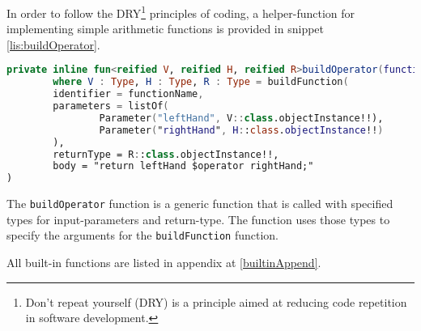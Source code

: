 In order to follow the DRY\footnote{Don't repeat yourself (DRY) is a principle aimed at reducing code repetition in software development.
} principles of coding, a helper-function for implementing simple arithmetic functions is provided in snippet \ref{lis:buildOperator}.
\begin{lstlisting}[language=Kotlin,label=lis:buildOperator,caption=The implementation of buildOperator.]
private inline fun<reified V, reified H, reified R>buildOperator(functionName: String, operator: String = functionName)
        where V : Type, H : Type, R : Type = buildFunction(
        identifier = functionName,
        parameters = listOf(
                Parameter("leftHand", V::class.objectInstance!!),
                Parameter("rightHand", H::class.objectInstance!!)
        ),
        returnType = R::class.objectInstance!!,
        body = "return leftHand $operator rightHand;"
)
\end{lstlisting}
The \texttt{buildOperator} function is a generic function that is called with specified types for input-parameters and return-type. 
The function uses those types to specify the arguments for the \texttt{buildFunction} function.

All built-in functions are listed in appendix at \ref{builtinAppend}.